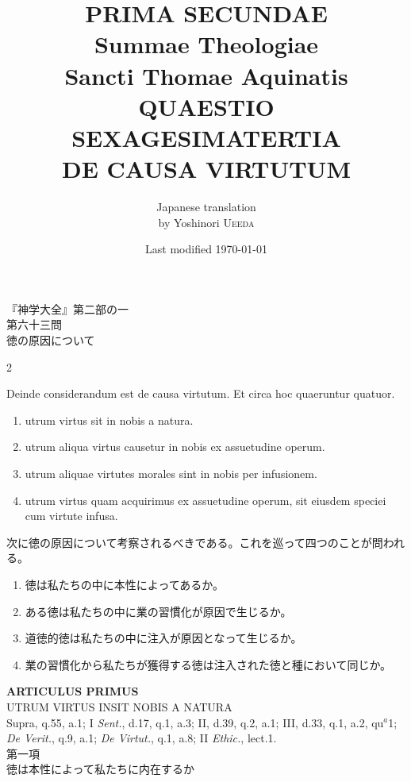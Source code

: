 \documentclass[paper=a4paper,fontsize=10pt,jafontsize=9pt,titlepage]{jlreq}
\title{{\bfseries PRIMA SECUNDAE}\\{\Huge Summae Theologiae}\\Sancti Thomae
Aquinatis\\{\sffamily QUAESTIO SEXAGESIMATERTIA}\\DE CAUSA VIRTUTUM}
\author{Japanese translation\\by Yoshinori {\scshape Ueeda}}
\date{Last modified \today}
\begin{document}
\maketitle
\thispagestyle{empty}

\begin{center}
{\LARGE 『神学大全』第二部の一}\\
{\Large 第六十三問\\徳の原因について}
\end{center}

\begin{paracol}{2}

Deinde considerandum est de causa virtutum. Et circa hoc quaeruntur
quatuor.

\begin{enumerate}
 \item utrum virtus sit in nobis a natura.
 \item utrum aliqua virtus causetur in nobis ex assuetudine operum.
 \item utrum aliquae virtutes morales sint in nobis per infusionem.
 \item utrum virtus quam acquirimus ex assuetudine operum, sit eiusdem
 speciei cum virtute infusa.
\end{enumerate}

\switchcolumn

次に徳の原因について考察されるべきである。これを巡って四つのことが問われる。

\begin{enumerate}
 \item 徳は私たちの中に本性によってあるか。
 \item ある徳は私たちの中に業の習慣化が原因で生じるか。
 \item 道徳的徳は私たちの中に注入が原因となって生じるか。
 \item 業の習慣化から私たちが獲得する徳は注入された徳と種において同じか。
\end{enumerate}

\end{paracol}

\newpage
{}
{}
\setcounter{section}{1}
\setcounter{subsection}{0}



\begin{center}
{\Large {\bfseries ARTICULUS PRIMUS}}\\
{\large UTRUM VIRTUS INSIT NOBIS A NATURA}\\
{\footnotesize Supra, q.55, a.1; I {\itshape Sent.}, d.17, q.1, a.3; II, d.39, q.2, a.1; III, d.33, q.1, a.2, qu$^{a}$1;\\ {\itshape De Verit.}, q.9, a.1; {\itshape De Virtut.}, q.1, a.8; II {\itshape Ethic.}, lect.1.}\\
{\Large 第一項\\徳は本性によって私たちに内在するか}
\end{center}
\end{document}
